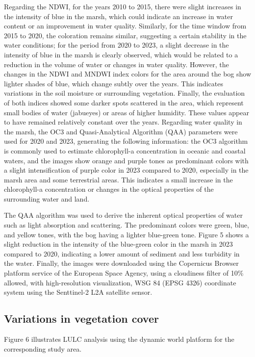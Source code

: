 \documentclass[10pt,a4paper,twocolumn]{article}
\begin{document}
Regarding the NDWI, for the years 2010 to 2015, there were slight increases in the intensity of blue in the marsh, which could indicate an increase in water content or an improvement in water quality. Similarly, for the time window from 2015 to 2020, the coloration remains similar, suggesting a certain stability in the water conditions; for the period from 2020 to 2023, a slight decrease in the intensity of blue in the marsh is clearly observed, which would be related to a reduction in the volume of water or changes in water quality. However, the changes in the NDWI and MNDWI index colors for the area around the bog show lighter shades of blue, which change subtly over the years. This indicates variations in the soil moisture or surrounding vegetation. Finally, the evaluation of both indices showed some darker spots scattered in the area, which represent small bodies of water (jabueyes) or areas of higher humidity. These values appear to have remained relatively constant over the years.
Regarding water quality in the marsh, the OC3 and Quasi-Analytical Algorithm (QAA) parameters were used for 2020 and 2023, generating the following information: the OC3 algorithm is commonly used to estimate chlorophyll-a concentration in oceanic and coastal waters, and the images show orange and purple tones as predominant colors with a slight intensification of purple color in 2023 compared to 2020, especially in the marsh area and some terrestrial areas. This indicates a small increase in the chlorophyll-a concentration or changes in the optical properties of the surrounding water and land.

The QAA algorithm was used to derive the inherent optical properties of water such as light absorption and scattering. The predominant colors were green, blue, and yellow tones, with the bog having a lighter blue-green tone. Figure 5 shows a slight reduction in the intensity of the blue-green color in the marsh in 2023 compared to 2020, indicating a lower amount of sediment and less turbidity in the water. Finally, the images were downloaded using the Copernicus Browser platform service of the European Space Agency, using a cloudiness filter of 10\% allowed, with high-resolution visualization, WSG 84 (EPSG 4326) coordinate system using the Senttinel-2 L2A satellite sensor.


\subsection*{Variations in vegetation cover}
Figure 6 illustrates LULC analysis using the dynamic world platform for the corresponding study area. 
\end{document}
